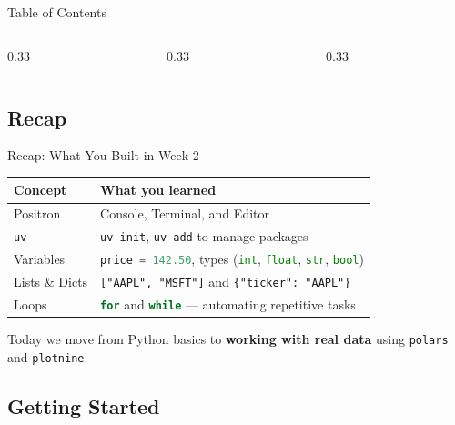 \documentclass[9pt,aspectratio=169]{beamer}
\newcommand{\py}[1]{\lstinline[language=Python]{#1}}
\begin{document}
\begin{frame}{Table of Contents}
\footnotesize
\begin{columns}[t]
  \begin{column}{0.33\textwidth}
    \tableofcontents[sections={1-4}]
  \end{column}
  \begin{column}{0.33\textwidth}
    \tableofcontents[sections={5-7}]
  \end{column}
  \begin{column}{0.33\textwidth}
    \tableofcontents[sections={8-10}]
  \end{column}
\end{columns}
\end{frame}


\subsection{Recap}
\begin{frame}{Recap: What You Built in Week 2}

\begin{tabular}{@{}lp{8cm}@{}}
\toprule
\textbf{Concept} & \textbf{What you learned} \\
\midrule
Positron & Console, Terminal, and Editor \\[0.3em]
\texttt{uv} & \texttt{uv init}, \texttt{uv add} to manage packages \\[0.3em]
Variables & \py{price = 142.50}, types (\py{int}, \py{float}, \py{str}, \py{bool}) \\[0.3em]
Lists \& Dicts & \texttt{["AAPL", "MSFT"]} and \texttt{\{"ticker": "AAPL"\}} \\[0.3em]
Loops & \py{for} and \py{while} --- automating repetitive tasks \\
\bottomrule
\end{tabular}

\bigskip

\begin{highlightbox}
\centering
Today we move from Python basics to \textbf{working with real data} using \texttt{polars} and \texttt{plotnine}.
\end{highlightbox}

\end{frame}


\subsection{Getting Started}
\end{document}
